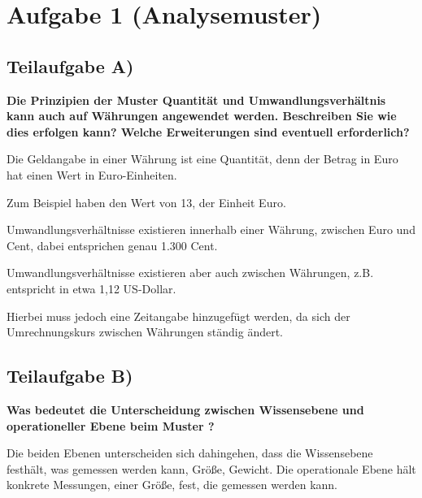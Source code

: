 \section{Aufgabe 1 (Analysemuster)}

\subsection{Teilaufgabe A)}
\textbf{Die Prinzipien der Muster Quantität und Umwandlungsverhältnis kann auch auf
Währungen angewendet werden. Beschreiben Sie wie dies erfolgen kann? Welche
Erweiterungen sind eventuell erforderlich?}

Die Geldangabe in einer Währung ist eine Quantität, denn der Betrag in \zB Euro
hat einen Wert in Euro-Einheiten. 

Zum Beispiel  haben den Wert von 13, der Einheit Euro.

Umwandlungsverhältnisse existieren innerhalb einer Währung, \zB zwischen Euro
und Cent, dabei entsprichen  genau 1.300 Cent. 

Umwandlungsverhältnisse existieren aber auch zwischen Währungen, z.B.
entspricht  in etwa 1,12 US-Dollar. 

Hierbei muss jedoch eine Zeitangabe hinzugefügt werden, da sich der
Umrechnungskurs zwischen Währungen ständig ändert.

\subsection{Teilaufgabe B)}
\textbf{Was bedeutet die Unterscheidung zwischen Wissensebene und operationeller Ebene
beim Muster ?}

Die beiden Ebenen unterscheiden sich dahingehen, dass die Wissensebene
festhält, was gemessen werden kann, \zB Größe, Gewicht. Die operationale Ebene
hält konkrete Messungen, \zB einer Größe, fest, die gemessen werden kann.
\clearpage
